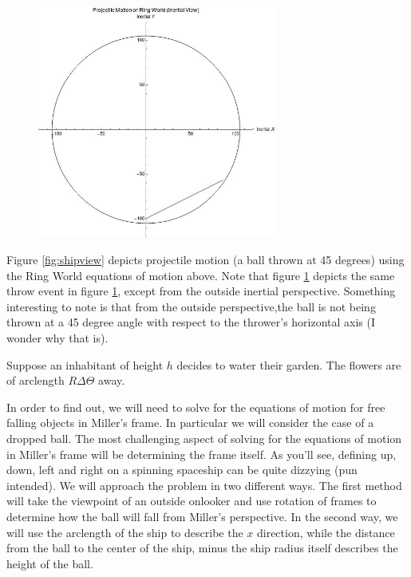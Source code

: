 \documentclass{amsart}
\theoremstyle{definition}
\begin{document}
\begin{figure}[h]
  \centering
  \includegraphics[width=0.7\textwidth]{InertialArclengthProjectileLabeled.jpg}
  \label{fig:inertialview}
  \caption{}
\end{figure}

Figure \ref{fig:shipview} depicts projectile motion (a ball thrown at
45 degrees) using the Ring World equations of motion above. Note that
figure \ref{fig:inertialview} depicts the same throw event in figure
\ref{fig:inertialview}, except from the outside inertial
perspective. Something interesting to note is that from the outside
perspective,the ball is not being thrown at a 45 degree angle with
respect to the thrower's horizontal axis (I wonder why that is).


Suppose an inhabitant of height $h$ decides to water their garden. The flowers are of arclength $R\Delta\Theta$ away. 

In order to find out, we will need to solve for the equations of
motion for free falling objects in Miller's frame. In particular we
will consider the case of a dropped ball. The most challenging aspect
of solving for the equations of motion in Miller's frame will be
determining the frame itself. As you'll see, defining up, down, left
and right on a spinning spaceship can be quite dizzying (pun
intended). We will approach the problem in two different ways. The
first method will take the viewpoint of an outside onlooker and use
rotation of frames to determine how the ball will fall from Miller's
perspective. In the second way, we will use the arclength of the ship
to describe the $x$ direction, while the distance from the ball to the
center of the ship, minus the ship radius itself describes the height
of the ball.
\end{document}
